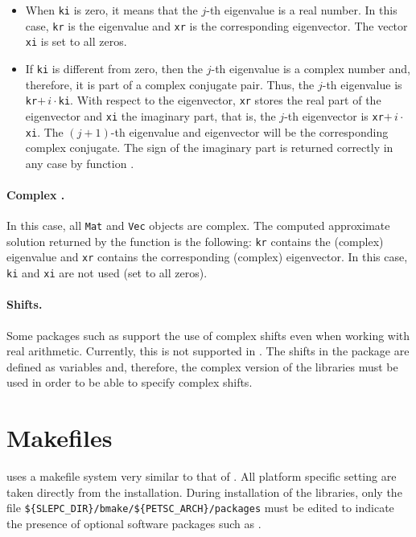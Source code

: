 \begin{itemize}
\item	When \texttt{ki} is zero, it means that the $j$-th eigenvalue is a real number. In this case, \texttt{kr} is the eigenvalue and \texttt{xr} is the corresponding eigenvector. The vector \texttt{xi} is set to all zeros.

\item	If \texttt{ki} is different from zero, then the $j$-th eigenvalue is a complex number and, therefore, it is part of a complex conjugate pair. Thus, the $j$-th eigenvalue is \texttt{kr}$+\,i\cdot$\texttt{ki}.
With respect to the eigenvector, \texttt{xr} stores the real part of the eigenvector and \texttt{xi} the imaginary part, that is, the $j$-th eigenvector is \texttt{xr}$+\,i\cdot$\texttt{xi}. The $(j+1)$-th eigenvalue and eigenvector will be the corresponding complex conjugate. The sign of the imaginary part is returned correctly in any case by function .
\end{itemize}

\paragraph{Complex \slepc.} In this case, all \texttt{Mat} and \texttt{Vec} objects are complex. The computed approximate solution returned by the function  is the following: \texttt{kr} contains the (complex) eigenvalue and \texttt{xr} contains the corresponding (complex) eigenvector. In this case, \texttt{ki} and \texttt{xi} are not used (set to all zeros).

\paragraph{Shifts.} Some packages such as \arpack{} support the use of complex shifts even when working with real arithmetic. Currently, this is not supported in \slepc. The shifts in the  package are defined as  variables and, therefore, the complex version of the libraries must be used in order to be able to specify complex shifts.

\section{Makefiles}
\label{sec:makefile}

	\slepc uses a makefile system very similar to that of \petsc. All platform specific setting are taken directly from the \petsc{} installation. During installation of the \slepc libraries, only the file \Verb!${SLEPC_DIR}/bmake/${PETSC_ARCH}/packages! must be edited to indicate the presence of optional software packages such as \arpack.

